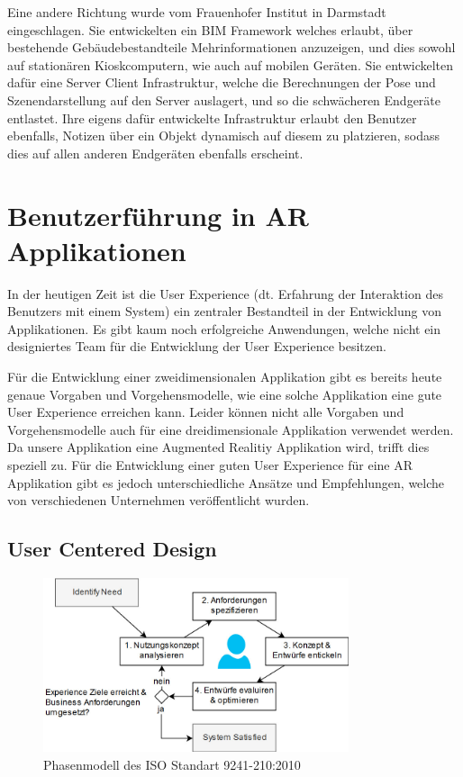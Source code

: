 \documentclass[a4paper]{scrreprt}
\begin{document}
Eine andere Richtung wurde vom Frauenhofer Institut in Darmstadt \parencite{Olbrich2013} eingeschlagen. Sie entwickelten ein BIM Framework welches erlaubt, über bestehende Gebäudebestandteile Mehrinformationen anzuzeigen, und dies sowohl auf stationären Kioskcomputern, wie auch auf mobilen Geräten. Sie entwickelten dafür eine Server Client Infrastruktur, welche die Berechnungen der Pose und Szenendarstellung auf den Server auslagert, und so die schwächeren Endgeräte entlastet. Ihre eigens dafür entwickelte Infrastruktur erlaubt den Benutzer ebenfalls, Notizen über ein Objekt dynamisch auf diesem zu platzieren, sodass dies auf allen anderen Endgeräten ebenfalls erscheint.

\section{Benutzerführung in AR Applikationen}
In der heutigen Zeit ist die User Experience (dt. Erfahrung der Interaktion des Benutzers mit einem System) ein zentraler Bestandteil in der Entwicklung von Applikationen. Es gibt kaum noch erfolgreiche Anwendungen, welche nicht ein designiertes Team für die Entwicklung der User Experience besitzen.

Für die Entwicklung einer zweidimensionalen Applikation gibt es bereits heute genaue Vorgaben und Vorgehensmodelle, wie eine solche Applikation eine gute User Experience erreichen kann. Leider können nicht alle Vorgaben und Vorgehensmodelle auch für eine dreidimensionale Applikation verwendet werden. Da unsere Applikation eine Augmented Realitiy Applikation wird, trifft dies speziell zu.
Für die Entwicklung einer guten User Experience für eine AR Applikation gibt es jedoch unterschiedliche Ansätze und Empfehlungen, welche von verschiedenen Unternehmen veröffentlicht wurden.

\subsection{User Centered Design}
\begin{figure}[h!]
	\centering
	\includegraphics[keepaspectratio,width=0.8\textwidth]{UserCenteredDesign}
	\caption{Phasenmodell des ISO Standart 9241-210:2010 \parencite{ISO9241}}
\end{figure}
\end{document}

